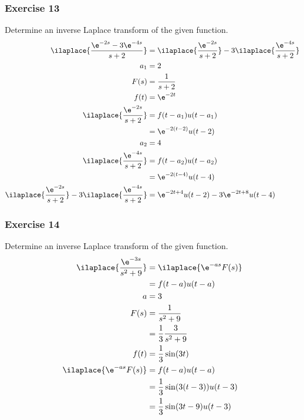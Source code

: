 \documentclass{math}
\begin{document}
\subsubsection*{Exercise 13}
Determine an inverse Laplace transform of the given function.
\begin{align*}
  \ilaplace{\frac{\e^{-2s}-3\e^{-4s}}{s+2}} &=
    \ilaplace{\frac{\e^{-2s}}{s+2}}-3\ilaplace{\frac{\e^{-4s}}{s+2}} \\
  a_1 &= 2 \\
  F(s) &= \frac{1}{s+2} \\
  f(t) &= \e^{-2t} \\
  \ilaplace{\frac{\e^{-2s}}{s+2}} &= f(t-a_1)u(t-a_1) \\
  &= \e^{-2(t-2)}u(t-2) \\
  a_2 &= 4 \\
  \ilaplace{\frac{\e^{-4s}}{s+2}} &= f(t-a_2)u(t-a_2) \\
  &= \e^{-2(t-4)}u(t-4) \\
  \ilaplace{\frac{\e^{-2s}}{s+2}}-3\ilaplace{\frac{\e^{-4s}}{s+2}} &=
    \e^{-2t+4}u(t-2)-3\e^{-2t+8}u(t-4)
\end{align*}

\subsubsection*{Exercise 14}
Determine an inverse Laplace transform of the given function.
\begin{align*}
  \ilaplace{\frac{\e^{-3s}}{s^2+9}} &= \ilaplace{\e^{-as}F(s)} \\
  &= f(t-a)u(t-a) \\
  a &= 3 \\
  F(s) &= \frac{1}{s^2+9} \\
  &= \frac{1}{3}\frac{3}{s^2+9} \\
  f(t) &= \frac{1}{3}\sin(3t) \\
  \ilaplace{\e^{-as}F(s)} &= f(t-a)u(t-a) \\
  &= \frac{1}{3}\sin(3(t-3))u(t-3) \\
  &= \frac{1}{3}\sin(3t-9)u(t-3)
\end{align*}
\end{document}
